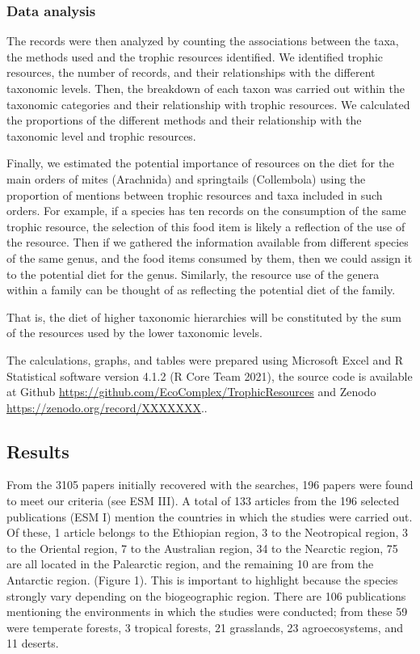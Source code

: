 \documentclass[10pt,oneside]{article}
\begin{document}
\hypertarget{data-analysis}{%
\subsubsection{Data analysis}\label{data-analysis}}

The records were then analyzed by counting the associations between the
taxa, the methods used and the trophic resources identified. We
identified trophic resources, the number of records, and their
relationships with the different taxonomic levels. Then, the breakdown
of each taxon was carried out within the taxonomic categories and their
relationship with trophic resources. We calculated the proportions of
the different methods and their relationship with the taxonomic level
and trophic resources.

Finally, we estimated the potential importance of resources on the diet
for the main orders of mites (Arachnida) and springtails (Collembola)
using the proportion of mentions between trophic resources and taxa
included in such orders. For example, if a species has ten records on
the consumption of the same trophic resource, the selection of this food
item is likely a reflection of the use of the resource. Then if we
gathered the information available from different species of the same
genus, and the food items consumed by them, then we could assign it to
the potential diet for the genus. Similarly, the resource use of the
genera within a family can be thought of as reflecting the potential
diet of the family.

That is, the diet of higher taxonomic hierarchies will be constituted by
the sum of the resources used by the lower taxonomic levels.

The calculations, graphs, and tables were prepared using Microsoft Excel
and R Statistical software version 4.1.2 (R Core Team 2021), the source
code is available at Github
\url{https://github.com/EcoComplex/TrophicResources} and Zenodo
\url{https://zenodo.org/record/XXXXXXX}..

\hypertarget{results}{%
\subsection{Results}\label{results}}

From the 3105 papers initially recovered with the searches, 196 papers
were found to meet our criteria (see ESM III). A total of 133 articles
from the 196 selected publications (ESM I) mention the countries in
which the studies were carried out. Of these, 1 article belongs to the
Ethiopian region, 3 to the Neotropical region, 3 to the Oriental region,
7 to the Australian region, 34 to the Nearctic region, 75 are all
located in the Palearctic region, and the remaining 10 are from the
Antarctic region. (Figure 1). This is important to highlight because the
species strongly vary depending on the biogeographic region. There are
106 publications mentioning the environments in which the studies were
conducted; from these 59 were temperate forests, 3 tropical forests, 21
grasslands, 23 agroecosystems, and 11 deserts.
\end{document}

